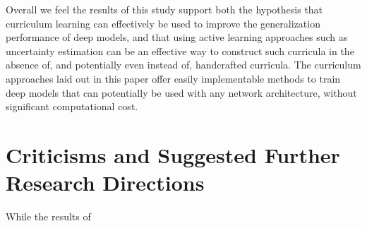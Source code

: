Overall we feel the results of this study support both the hypothesis that curriculum learning can effectively be used to improve the generalization performance of deep models, and that using active learning approaches such as uncertainty estimation can be an effective way to construct such curricula in the absence of, and potentially even instead of, handcrafted curricula. The curriculum approaches laid out in this paper offer easily implementable methods to train deep models that can potentially be used with any network architecture, without significant computational cost. 

\section{Criticisms and Suggested Further Research Directions}
While the results of 